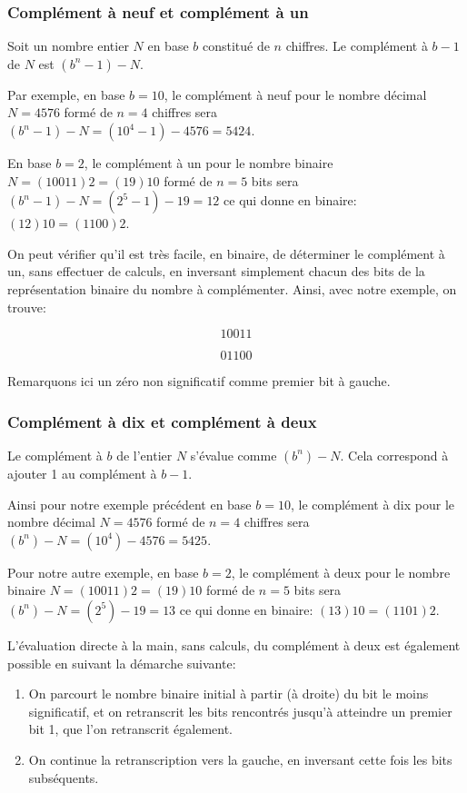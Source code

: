 \documentclass[11pt]{article}
\begin{document}
\subsubsection{Complément à neuf et complément à un}
\label{sec:org8254b63}

Soit un nombre entier \(N\) en base \(b\) constitué de \(n\) chiffres. Le
complément à \(b-1\) de \(N\) est \((b^n-1)-N\).

Par exemple, en base \(b=10\), le complément à neuf pour le nombre décimal
\(N = 4576\) formé de \(n=4\) chiffres sera \((b^n-1)-N = (10^4 -1) -
4576 = 5424\).

En base \(b=2\), le complément à un pour le nombre binaire \(N =
(10011)2 = (19)10\) formé de \(n=5\) bits sera \((b^n-1)-N = (2^5
-1) - 19 = 12\) ce qui donne en binaire: \((12)10 = (1100)2\).

On peut vérifier qu'il est très facile, en binaire, de déterminer le
complément à un, sans effectuer de calculs, en inversant simplement
chacun des bits de la représentation binaire du nombre à
complémenter. Ainsi, avec notre exemple, on trouve:

$$ 10011 $$

$$ 01100 $$

Remarquons ici un zéro non significatif comme premier bit à gauche.

\subsubsection{Complément à dix et complément à deux}
\label{sec:org682938e}

Le complément à \(b\) de l'entier \(N\) s'évalue comme
\((b^n)-N\). Cela correspond à ajouter 1 au complément à \(b-1\).

Ainsi pour notre exemple précédent en base \(b=10\), le complément à
dix pour le nombre décimal \(N = 4576\) formé de \(n=4\) chiffres sera
\((b^n)-N = (10^4) - 4576 = 5425\).

Pour notre autre exemple, en base \(b=2\), le complément à deux pour
le nombre binaire \(N = (10011)2 = (19)10\) formé de \(n=5\) bits
sera \((b^n)-N = (2^5) - 19 = 13\) ce qui donne en binaire:
\((13)10 = (1101)2\).

L'évaluation directe à la main, sans calculs, du complément à deux est
également possible en suivant la démarche suivante:
\begin{enumerate}
\item On parcourt le nombre binaire initial à partir (à droite) du bit le moins
significatif, et on retranscrit les bits rencontrés jusqu'à
atteindre un premier bit 1, que l'on retranscrit également.
\item On continue la retranscription vers la gauche, en inversant cette
fois les bits subséquents.
\end{enumerate}
\end{document}
